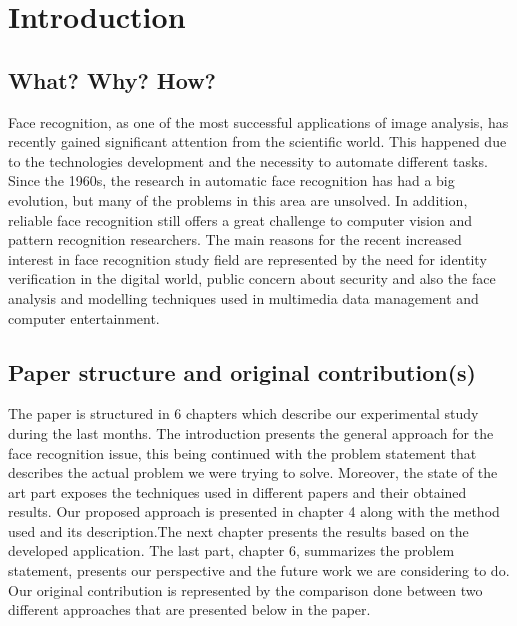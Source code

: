 \documentclass[runningheads,a4paper,11pt]{report}
\begin{document}
    \tableofwcontents

    \newpage

    \listoftables
    \listoffigures

    \newpage




    \newpage






    \chapter{Introduction}
    \label{chapter:introduction}

    \section{What? Why? How?}
    \label{section:what}

    Face recognition, as one of the most successful applications of image analysis, has recently gained significant attention from the scientific world. This happened due to the technologies development and the necessity to automate different tasks. Since the 1960s, the research in automatic face recognition has had a big evolution, but many of the problems in this area are unsolved. In addition, reliable face recognition still offers a great challenge to computer vision and pattern recognition researchers. The main reasons for the recent increased interest in face recognition study field are represented by the need for identity verification in the digital world, public concern about security and also the face analysis and modelling techniques used in multimedia data management and computer entertainment.



    \section{Paper structure and original contribution(s)}
    \label{section:structure}
    The paper is structured in 6 chapters which describe our experimental study during the last months. The introduction presents the general approach for the face recognition issue, this being continued with the problem statement that describes the actual problem we were trying to solve. Moreover, the state of the art part exposes the techniques used in different papers and their obtained results. Our proposed approach is presented in chapter 4 along with the method used and its description.The next chapter presents the results based on the developed application. The last part, chapter 6, summarizes the problem statement, presents our perspective and the future work we are considering to do.
    Our original contribution is represented by the comparison done between two different approaches that are presented below in the paper.
\end{document}

